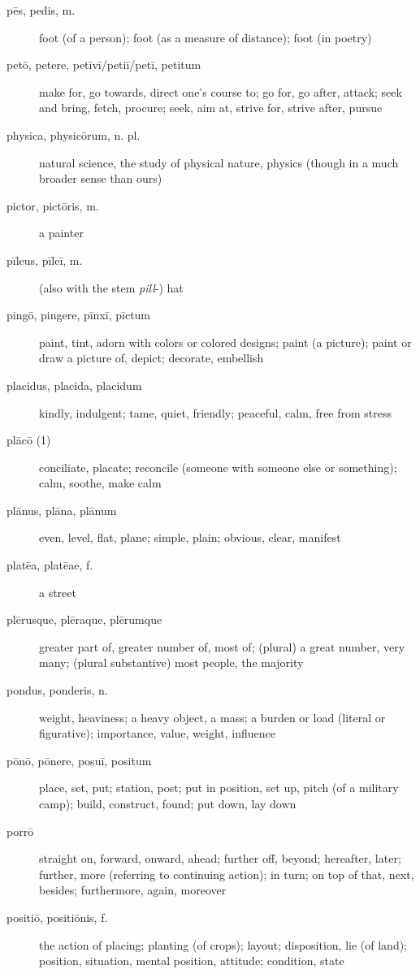 \begin{description}
    \item[pēs, pedis, m.] \marginnote{*}foot (of a person); foot (as a measure of distance); foot (in poetry)
    \item[petō, petere, petīvī/petiī/petī, petitum] \marginnote{*}make for, go towards, direct one's course to; go for, go after, attack; seek and bring, fetch, procure; seek, aim at, strive for, strive after, pursue
    \item[physica, physicōrum, n. pl.] natural science, the study of physical nature, physics (though in a much broader sense than ours)
    \item[pictor, pictōris, m.] a painter
    \item[pīleus, pīleī, m.] (also with the stem \textit{pill}-) hat
    \item[pingō, pingere, pīnxī, pīctum] paint, tint, adorn with colors or colored designs; paint (a picture); paint or draw a picture of, depict; decorate, embellish
    \item[placidus, placida, placidum] kindly, indulgent; tame, quiet, friendly; peaceful, calm, free from stress
    \item[plācō (1)] conciliate, placate; reconcile (someone with someone else or something); calm, soothe, make calm
    \item[plānus, plāna, plānum] even, level, flat, plane; simple, plain; obvious, clear, manifest
    \item[platēa, platēae, f.] a street
    \item[plērusque, plēraque, plērumque] \marginnote{*}greater part of, greater number of, most of; (plural) a great number, very many; (plural substantive) most people, the majority
    \item[pondus, ponderis, n.] \marginnote{*}weight, heaviness; a heavy object, a mass; a burden or load (literal or figurative); importance, value, weight, influence
    \item[pōnō, pōnere, posuī, positum] \marginnote{*}place, set, put; station, post; put in position, set up, pitch (of a military camp); build, construct, found; put down, lay down
    \item[porrō] straight on, forward, onward, ahead; further off, beyond; hereafter, later; further, more (referring to continuing action); in turn; on top of that, next, besides; furthermore, again, moreover
    \item[positiō, positiōnis, f.] the action of placing; planting (of crops); layout; disposition, lie (of land); position, situation, mental position, attitude; condition, state

\end{description}
